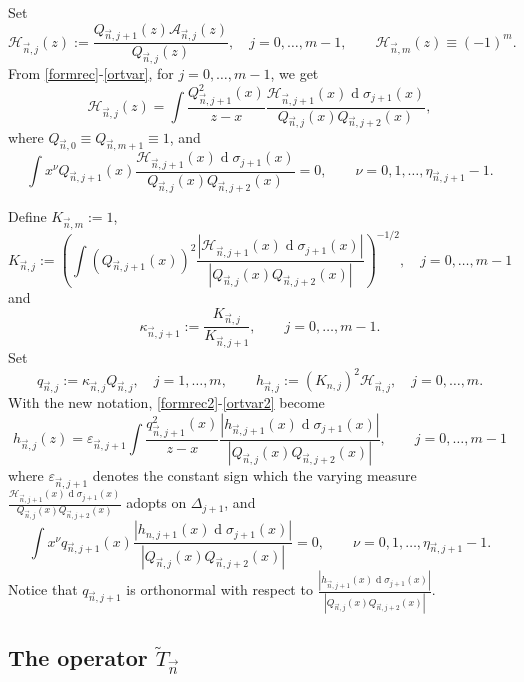 \documentclass{amsart}
\numberwithin{equation}{section}
\theoremstyle{definition}
\DeclareMathOperator{\D}{d}        %
\newcommand{\n}{\vec{n}}          %
\begin{document}
 Set
 \[
   \mathcal{H}_{\n,j}(z) := \frac{Q_{\n,j+1}(z) \mathcal{A}_{\n,j}(z)}{Q_{\n,j}(z)}, \quad j=0,\ldots,m-1, \qquad \mathcal{H}_{\n,m}(z) \equiv (-1)^m.
 \]
From \eqref{formrec}-\eqref{ortvar}, for $j=0,\ldots,m-1$, we get
\begin{equation}
    \label{formrec2}
    \mathcal{H}_{\n,j}(z)  = \int \frac{Q_{\n,j+1}^2(x)}{z-x}\frac{\mathcal{H}_{\n,j+1}(x) \D \sigma_{j+1}(x)}{Q_{\n,j}(x)Q_{\n,j+2}(x)},
\end{equation}
 where $Q_{\n,0} \equiv Q_{\n,m+1}  \equiv 1$, and
\begin{equation}
    \label{ortvar2}
    \int x^\nu Q_{\n,j+1}(x) \frac{\mathcal{H}_{\n,j+1}(x) \D \sigma_{j+1}(x)}{Q_{\n,j}(x)Q_{\n,j+2}(x)}=0,\qquad \nu=0,1,\ldots, \eta_{\n,j+1}-1.
 \end{equation}

 Define $K_{\n,m}:= 1$,
    \[
      K_{\n,j}:= \left(\int (Q_{\n,j+1}(x))^2 \frac{| \mathcal{H}_{\n,j+1}(x)\D \sigma_{j+1}(x)|}{| {Q}_{\n,j}(x) {Q}_{\n,j+2}(x)|}\right)^{-1/2},\quad j=0,\ldots,m-1
    \]
    and
    \begin{equation}
        \label{def:kappa}
        \kappa_{\n,j+1}:= \frac{K_{\n,j}}{K_{\n,j+1}},\qquad j=0,\ldots,m-1.
    \end{equation}
    Set
    \begin{equation*}
        \label{orthonormal}
        q_{\n,j} := \kappa_{\n,j}Q_{\n,j}, \quad j=1,\ldots,m, \qquad  {h}_{\n,j} := (K_{n,j})^2 \mathcal{H}_{\n,j} ,\quad j=0,\ldots,m.
    \end{equation*}
 With the new notation, \eqref{formrec2}-\eqref{ortvar2} become
 \begin{equation}
 	\label{formrec3}
    h_{\n,j}(z)  = \varepsilon_{\n,j+1} \int \frac{q_{\n,j+1}^2(x)}{z-x} \frac{|h_{\n,j+1}(x)\D \sigma_{j+1}(x)|}{|Q_{\n,j}(x)Q_{\n,j+2}(x)|},  \qquad j=0,\ldots,m-1
 \end{equation}
 where $\varepsilon_{\n,j+1} $ denotes the constant sign which the varying measure $\frac{\mathcal{H}_{\n,j+1}(x) \D \sigma_{j+1}(x)}{Q_{\n,j}(x)Q_{\n,j+2}(x)}$ adopts on $\Delta_{j+1}$, and
\[
    \int x^\nu q_{\n,j+1}(x) \frac{|h_{n,j+1}(x)\D \sigma_{j+1}(x)|}{|Q_{\n,j}(x)Q_{\n,j+2}(x)|}=0,\qquad \nu=0,1,\ldots, \eta_{\n,j+1}-1.
 \]
 Notice that $q_{\n,j+1}$ is orthonormal with respect to $ \frac{|h_{\n,j+1}(x) \D \sigma_{j+1}(x)|}{|Q_{\n,j}(x)Q_{\n,j+2}(x)|}$.

\subsection{The operator $\tilde{T}_{\n}$}
\end{document}
